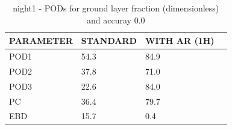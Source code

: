 \begin{table}[p!]
\begin{center}
\begin{tabular}{|l|l|l|l|}
\hline
\multicolumn{1}{|c|}{\cellcolor[HTML]{C0C0C0}\textbf{PARAMETER}} & \multicolumn{1}{c|}{\cellcolor[HTML]{C0C0C0}\textbf{STANDARD}} & \multicolumn{1}{c|}{\cellcolor[HTML]{C0C0C0}\textbf{WITH AR (1H)}} \\
\hline
\cellcolor[HTML]{C0C0C0}POD1  & 54.3                                & 84.9         \\
\cellcolor[HTML]{C0C0C0}POD2  & 37.8                                & 71.0         \\
\cellcolor[HTML]{C0C0C0}POD3  & 22.6                                & 84.0         \\
\cellcolor[HTML]{C0C0C0}PC    & 36.4                                  & 79.7           \\
\cellcolor[HTML]{C0C0C0}EBD   & 15.7                                 & 0.4          \\
\hline
\end{tabular}
\caption{night1 - PODs for ground layer fraction (dimensionless) and accuray 0.0}
\label{tab:podglf0.0:night1}
\end{center}
\end{table}

